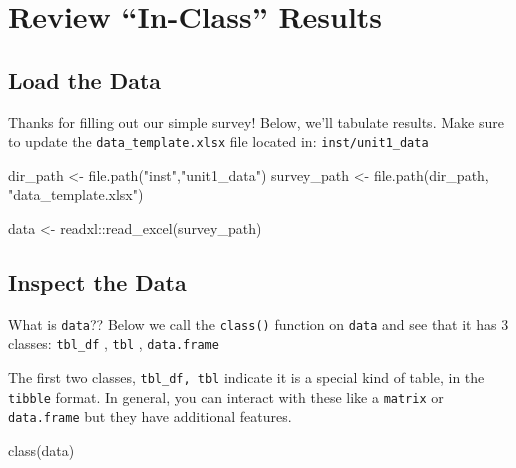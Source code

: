 \documentclass[
]{book}
\newenvironment{Shaded}{\begin{snugshade}}{\end{snugshade}}
\newcommand{\FunctionTok}[1]{\textcolor[rgb]{0.00,0.00,0.00}{#1}}
\newcommand{\NormalTok}[1]{#1}
\newcommand{\OtherTok}[1]{\textcolor[rgb]{0.56,0.35,0.01}{#1}}
\newcommand{\SpecialCharTok}[1]{\textcolor[rgb]{0.00,0.00,0.00}{#1}}
\newcommand{\StringTok}[1]{\textcolor[rgb]{0.31,0.60,0.02}{#1}}
\begin{document}
\hypertarget{review-in-class-results}{%
\section{Review ``In-Class'' Results}\label{review-in-class-results}}

\hypertarget{load-the-data}{%
\subsection{Load the Data}\label{load-the-data}}

Thanks for filling out our simple survey! Below, we'll tabulate results. Make sure to update the \texttt{data\_template.xlsx} file located in: \texttt{inst/unit1\_data}

\begin{Shaded}
\begin{Highlighting}[]
\NormalTok{dir\_path }\OtherTok{\textless{}{-}} \FunctionTok{file.path}\NormalTok{(}\StringTok{"inst"}\NormalTok{,}\StringTok{"unit1\_data"}\NormalTok{)}
\NormalTok{survey\_path }\OtherTok{\textless{}{-}} \FunctionTok{file.path}\NormalTok{(dir\_path, }\StringTok{"data\_template.xlsx"}\NormalTok{)}

\NormalTok{data }\OtherTok{\textless{}{-}}\NormalTok{ readxl}\SpecialCharTok{::}\FunctionTok{read\_excel}\NormalTok{(survey\_path)}
\end{Highlighting}
\end{Shaded}

\hypertarget{inspect-the-data}{%
\subsection{Inspect the Data}\label{inspect-the-data}}

What is \texttt{data}?? Below we call the \texttt{class()} function on \texttt{data} and see that it has 3 classes:
\texttt{tbl\_df} , \texttt{tbl} , \texttt{data.frame}

The first two classes, \texttt{tbl\_df,\ tbl} indicate it is a special kind of table, in the \texttt{tibble} format. In general, you can interact with these like a \texttt{matrix} or \texttt{data.frame} but they have additional features.

\begin{Shaded}
\begin{Highlighting}[]
\FunctionTok{class}\NormalTok{(data)}
\end{Highlighting}
\end{Shaded}
\end{document}
